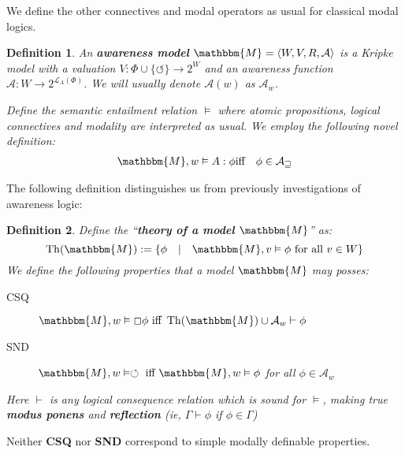 \documentclass{article}
\newcommand{\assign}{:=}
\newcommand{\tmop}[1]{\ensuremath{\operatorname{#1}}}
\newcommand{\tmstrong}[1]{\textbf{#1}}
\newcommand{\tmtextbf}[1]{{\bfseries{#1}}}
\newenvironment{descriptiondash}{\begin{description} }{\end{description}}
\newtheorem{definition}{Definition}
\begin{document}
We define the other connectives and modal operators as usual for classical
modal logics.

\begin{definition}
  \label{awarenessmodels}An {\tmstrong{awareness model}} $\mathbbm{M}= \langle
  W, V, R, \mathcal{A} \rangle$ is a Kripke model with a valuation $V : \Phi
  \cup \{\circlearrowleft\} \rightarrow 2^W$ and an awareness function
  $\mathcal{A} : W \rightarrow 2^{\mathcal{L}_A (\Phi)}$.  We will usually
  denote $\mathcal{A} (w)$ as $\mathcal{A}_w$.
  
  
  
  Define the semantic entailment relation $\vDash$ where atomic propositions,
  logical connectives and modality are interpreted as usual.  We employ the
  following novel definition:
  \begin{eqnarray*}
    \mathbbm{M}, w \vDash A : \phi & \text{iff} & \phi \in \mathcal{A_w}
  \end{eqnarray*}
\end{definition}

The following definition distinguishes us from previously investigations of
awareness logic:

\begin{definition}
  Define the ``\tmtextbf{theory of a model} $\mathbbm{M}$'' as:
  \[ \tmop{Th} (\mathbbm{M}) \assign \{\phi \hspace{1em} | \hspace{1em}
     \mathbbm{M}, v \vDash \phi \text{ for all } v \in W\} \]
  We define the following properties that a model $\mathbbm{M}$ may posses:
  
  \begin{descriptiondash}
    \item[CSQ] $\mathbbm{M}, w \vDash \Box \phi \text{ iff } \tmop{Th}
    (\mathbbm{M}) \cup \mathcal{A}_w \vdash \phi$
    
    \item[SND] $\mathbbm{M}, w \vDash \circlearrowleft \text{ iff }
    \mathbbm{M}, w \vDash \phi$ for all $\phi \in \mathcal{A}_w$
  \end{descriptiondash}
  
  Here $\vdash$ is any logical consequence relation which is sound for
  $\vDash$, making true \tmtextbf{modus ponens} and \tmtextbf{reflection} (ie,
  $\Gamma \vdash \phi$ if $\phi \in \Gamma$)
\end{definition}

Neither \tmtextbf{CSQ} nor \tmtextbf{SND} correspond to simple modally
definable properties.
\end{document}
